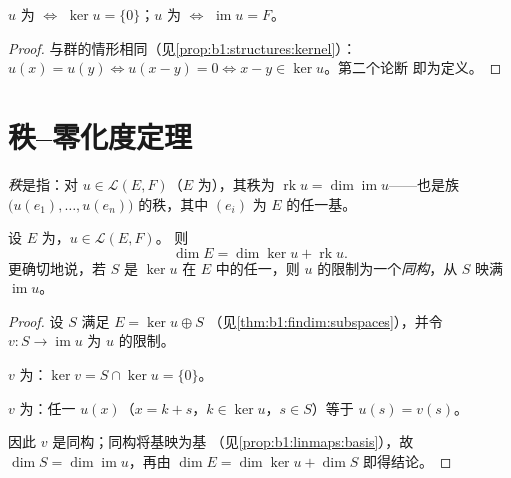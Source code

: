 \begin{proposition}\label{prop:b1:linmaps:kernel}
$u$ 为 $\iff$ $\ker u = \{0\}$；$u$ 为 $\iff$
$\operatorname{im} u = F$。
\end{proposition}

\begin{proof}
与群的情形相同（见\cref{prop:b1:structures:kernel}）：$u(x) = u(y) \iff
u(x - y) = 0 \iff x - y \in \ker u$。第二个论断
即为定义。
\end{proof}

\section{秩--零化度定理}

\begin{definition}\label{def:b1:linmaps:rank}
\emph{秩}是指：对 $u \in \mathcal{L}(E,
F)$（$E$ 为），其秩为 $\operatorname{rk} u = \dim
\operatorname{im} u$——也是族
$\bigl(u(e_1), \dots, u(e_n)\bigr)$ 的秩，其中 $(e_i)$ 为 $E$ 的任一基。
\end{definition}

\begin{theorem}[秩--零化度定理]\label{thm:b1:linmaps:ranknullity}
设 $E$ 为，$u \in \mathcal{L}(E, F)$。
则
\[
\dim E = \dim \ker u + \operatorname{rk} u .
\]
更确切地说，若 $S$ 是 $\ker u$ 在
$E$ 中的任一，则 $u$ 的限制为一个\emph{同构}，从 $S$ 映满
$\operatorname{im} u$。
\end{theorem}

\begin{proof}
设 $S$ 满足 $E = \ker u \oplus S$
（见\cref{thm:b1:findim:subspaces}），并令 $v \colon S \to
\operatorname{im} u$ 为 $u$ 的限制。

$v$ 为：$\ker v = S \cap \ker u = \{0\}$。

$v$ 为：任一 $u(x)$（$x = k + s$，$k \in \ker u$，$s
\in S$）等于 $u(s) = v(s)$。

因此 $v$ 是同构；同构将基映为基
（见\cref{prop:b1:linmaps:basis}），故 $\dim S = \dim\operatorname{im}
u$，再由 $\dim E = \dim\ker u + \dim S$ 即得结论。
\end{proof}

